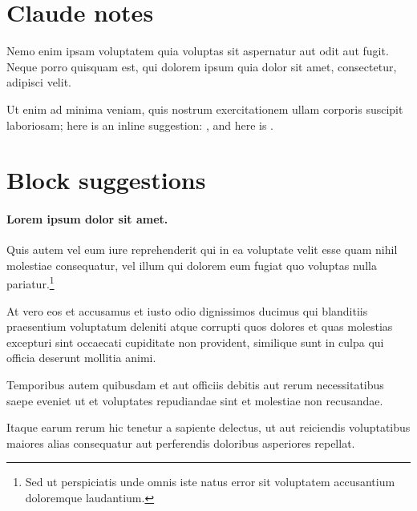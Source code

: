 \documentclass{article}
\begin{document}
\section{Claude notes}

Nemo enim ipsam voluptatem quia voluptas sit aspernatur aut odit aut
fugit.  Neque porro quisquam est, qui dolorem ipsum quia dolor sit amet,
consectetur, adipisci velit.

Ut enim ad minima veniam, quis nostrum exercitationem ullam corporis suscipit
laboriosam; here is an inline suggestion: , and here is
.

\section{Block suggestions}

\begin{ClaudeSuggest}[alice]
\paragraph{Lorem ipsum dolor sit amet.}
Quis autem vel eum iure reprehenderit qui in ea voluptate velit esse quam
nihil molestiae consequatur, vel illum qui dolorem eum fugiat quo voluptas
nulla pariatur.\footnote{Sed ut perspiciatis unde omnis iste natus error sit
voluptatem accusantium doloremque laudantium.}

At vero eos et accusamus et iusto odio dignissimos ducimus qui blanditiis
praesentium voluptatum deleniti atque corrupti quos dolores et quas molestias
excepturi sint occaecati cupiditate non provident, similique sunt in culpa
qui officia deserunt mollitia animi.

Temporibus autem quibusdam et aut officiis debitis aut rerum necessitatibus
saepe eveniet ut et voluptates repudiandae sint et molestiae non recusandae.
\end{ClaudeSuggest}

Itaque earum rerum hic tenetur a sapiente delectus, ut aut reiciendis
voluptatibus maiores alias consequatur aut perferendis doloribus asperiores
repellat.
\end{document}
